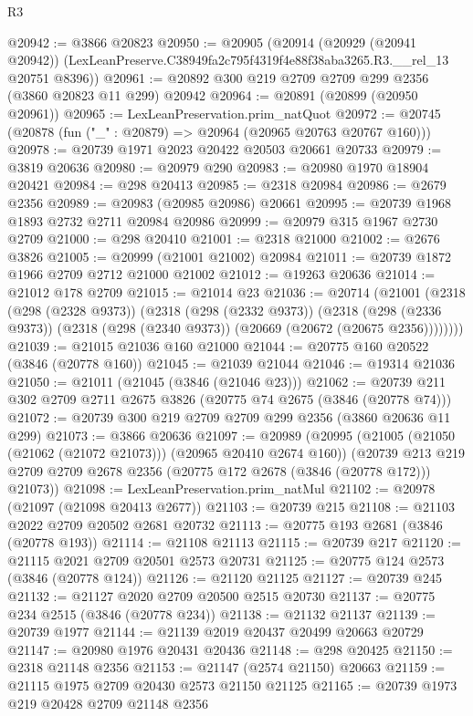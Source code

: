 \begin{lexlean}{R3}
\begin{coremodule}
@20942 := @3866 @20823
@20950 := @20905
    (@20914
      (@20929 (@20941 @20942))
      (LexLeanPreserve.C38949fa2c795f4319f4e88f38aba3265.R3.__rel_13 @20751 @8396))
@20961 := @20892 @300 @219 @2709 @2709 @299 @2356 (@3860 @20823 @11 @299) @20942
@20964 := @20891 (@20899 (@20950 @20961))
@20965 := LexLeanPreservation.prim_natQuot
@20972 := @20745 (@20878 (fun ("_" : @20879) => @20964 (@20965 @20763 @20767 @160)))
@20978 := @20739 @1971 @2023 @20422 @20503 @20661 @20733
@20979 := @3819 @20636
@20980 := @20979 @290
@20983 := @20980 @1970 @18904 @20421
@20984 := @298 @20413
@20985 := @2318 @20984
@20986 := @2679 @2356
@20989 := @20983 (@20985 @20986) @20661
@20995 := @20739 @1968 @1893 @2732 @2711 @20984 @20986
@20999 := @20979 @315 @1967 @2730 @2709
@21000 := @298 @20410
@21001 := @2318 @21000
@21002 := @2676 @3826
@21005 := @20999 (@21001 @21002) @20984
@21011 := @20739 @1872 @1966 @2709 @2712 @21000 @21002
@21012 := @19263 @20636
@21014 := @21012 @178 @2709
@21015 := @21014 @23
@21036 := @20714
    (@21001
      (@2318
        (@298 (@2328 @9373))
        (@2318
          (@298 (@2332 @9373))
          (@2318
            (@298 (@2336 @9373))
            (@2318 (@298 (@2340 @9373)) (@20669 (@20672 (@20675 @2356))))))))
@21039 := @21015 @21036 @160 @21000
@21044 := @20775 @160 @20522 (@3846 (@20778 @160))
@21045 := @21039 @21044
@21046 := @19314 @21036
@21050 := @21011 (@21045 (@3846 (@21046 @23)))
@21062 := @20739 @211 @302 @2709 @2711 @2675 @3826 (@20775 @74 @2675 (@3846 (@20778 @74)))
@21072 := @20739 @300 @219 @2709 @2709 @299 @2356 (@3860 @20636 @11 @299)
@21073 := @3866 @20636
@21097 := @20989
    (@20995
      (@21005 (@21050 (@21062 (@21072 @21073))) (@20965 @20410 @2674 @160))
      (@20739 @213 @219 @2709 @2709 @2678 @2356 (@20775 @172 @2678 (@3846 (@20778 @172))) @21073))
@21098 := LexLeanPreservation.prim_natMul
@21102 := @20978 (@21097 (@21098 @20413 @2677))
@21103 := @20739 @215
@21108 := @21103 @2022 @2709 @20502 @2681 @20732
@21113 := @20775 @193 @2681 (@3846 (@20778 @193))
@21114 := @21108 @21113
@21115 := @20739 @217
@21120 := @21115 @2021 @2709 @20501 @2573 @20731
@21125 := @20775 @124 @2573 (@3846 (@20778 @124))
@21126 := @21120 @21125
@21127 := @20739 @245
@21132 := @21127 @2020 @2709 @20500 @2515 @20730
@21137 := @20775 @234 @2515 (@3846 (@20778 @234))
@21138 := @21132 @21137
@21139 := @20739 @1977
@21144 := @21139 @2019 @20437 @20499 @20663 @20729
@21147 := @20980 @1976 @20431 @20436
@21148 := @298 @20425
@21150 := @2318 @21148 @2356
@21153 := @21147 (@2574 @21150) @20663
@21159 := @21115 @1975 @2709 @20430 @2573 @21150 @21125
@21165 := @20739 @1973 @219 @20428 @2709 @21148 @2356

\end{coremodule}
\end{lexlean}
